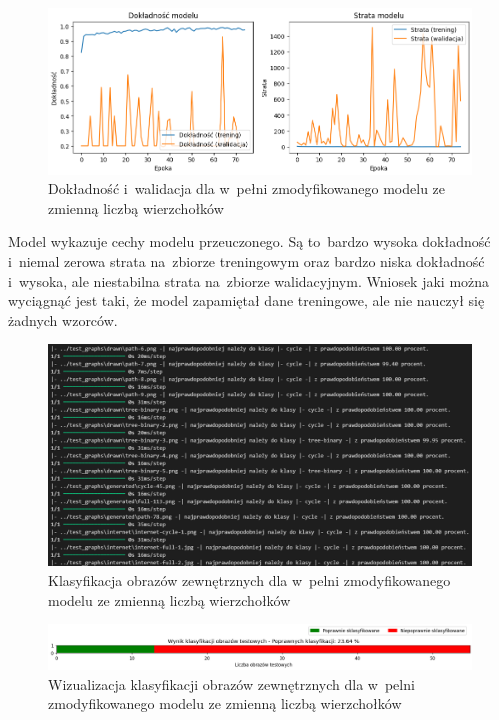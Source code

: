 \begin{figure}[ht]
	\centering
	\includegraphics[width=15.5cm]{resources/tests/images/v4/multiple_edges_img.png}
	\caption{Dokładność i~walidacja dla w~pełni zmodyfikowanego modelu ze zmienną liczbą wierzchołków}
	\label{Fig:tests-var-2a}
\end{figure}
\FloatBarrier

Model wykazuje cechy modelu przeuczonego.
Są to~bardzo wysoka dokładność i~niemal zerowa strata na~zbiorze treningowym
oraz bardzo niska dokładność i~wysoka, ale niestabilna strata na~zbiorze walidacyjnym.
Wniosek jaki można wyciągnąć jest taki, że model zapamiętał dane treningowe, ale nie nauczył się żadnych wzorców.

\begin{figure}[ht]
	\centering
	\includegraphics[width=15.5cm]{resources/tests/images/v4/multiple_edges_txt.png}
	\caption{Klasyfikacja obrazów zewnętrznych dla w~pelni zmodyfikowanego modelu ze zmienną liczbą wierzchołków}
	\label{Fig:tests-var-2b}
\end{figure}
\FloatBarrier

\begin{figure}[ht]
	\centering
	\includegraphics[width=15.5cm]{resources/tests/images/v4/multiple_edges_bar.png}
	\caption{Wizualizacja klasyfikacji obrazów zewnętrznych dla w~pelni zmodyfikowanego modelu ze zmienną liczbą wierzchołków}
	\label{Fig:tests-var-2c}
\end{figure}
\FloatBarrier

